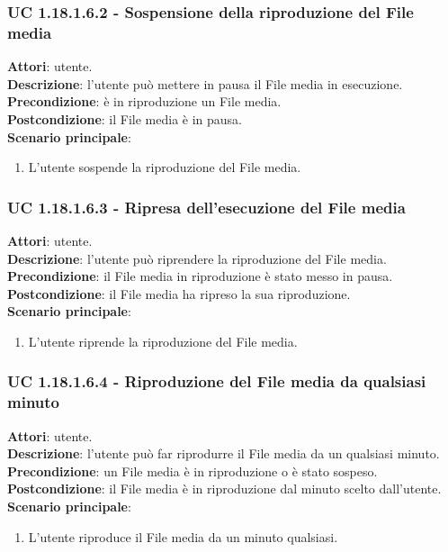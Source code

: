 	\subsubsection{UC 1.18.1.6.2 - Sospensione della riproduzione del File media}{
		\label{uc1.18.1.6.2}
		\textbf{Attori}: utente. \\
		\textbf{Descrizione}: l'utente può mettere in pausa il File media in esecuzione. \\
		\textbf{Precondizione}: è in riproduzione un File media.	\\
		\textbf{Postcondizione}: il File media è in pausa.\\
		\textbf{Scenario principale}:
		\begin{enumerate}
			\item L'utente sospende la riproduzione del File media.
		\end{enumerate}		
	}
	\subsubsection{UC 1.18.1.6.3 - Ripresa dell'esecuzione del File media}{
		\label{uc1.18.1.6.3}
		\textbf{Attori}: utente. \\
		\textbf{Descrizione}: l'utente può riprendere la riproduzione del File media. \\
		\textbf{Precondizione}: il File media in riproduzione è stato messo in pausa.	\\
		\textbf{Postcondizione}: il File media ha ripreso la sua riproduzione.\\
		\textbf{Scenario principale}:
		\begin{enumerate}
			\item L'utente riprende la riproduzione del File media.
		\end{enumerate}		
	}
	\subsubsection{UC 1.18.1.6.4 - Riproduzione del File media da qualsiasi minuto}{
		\label{uc1.18.1.6.4}
		\textbf{Attori}: utente. \\
		\textbf{Descrizione}: l'utente può far riprodurre il File media da un qualsiasi minuto. \\
		\textbf{Precondizione}: un File media è in riproduzione o è stato sospeso.	\\
		\textbf{Postcondizione}: il File media è in riproduzione dal minuto scelto dall'utente.\\
		\textbf{Scenario principale}:
		\begin{enumerate}
			\item L'utente riproduce il File media da un minuto qualsiasi. 
		\end{enumerate}		
	}
